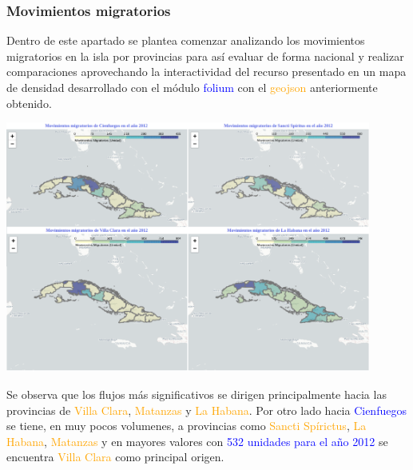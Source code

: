 \documentclass{article}
\begin{document}
\subsubsection{Movimientos migratorios}
Dentro de este apartado se plantea comenzar analizando los movimientos migratorios en la isla por provincias para así evaluar de forma nacional y realizar comparaciones aprovechando la interactividad del recurso presentado en un mapa de densidad desarrollado con el módulo \textcolor{blue}{folium} con el \textcolor{orange}{geojson} anteriormente obtenido.
\begin{center}
    \includegraphics[width=0.9\textwidth]{img/fig3.png}
\end{center}
\newpage
Se observa que los flujos más significativos se dirigen principalmente hacia las provincias de \textcolor{orange}{Villa Clara}, \textcolor{orange}{Matanzas} y \textcolor{orange}{La Habana}. Por otro lado hacia \textcolor{blue}{Cienfuegos} se tiene, en muy pocos volumenes, a provincias como \textcolor{orange}{Sancti Spírictus}, \textcolor{orange}{La Habana}, \textcolor{orange}{Matanzas} y en mayores valores con \textcolor{blue}{532 unidades para el año 2012} se encuentra \textcolor{orange}{Villa Clara} como principal origen.
\end{document}
